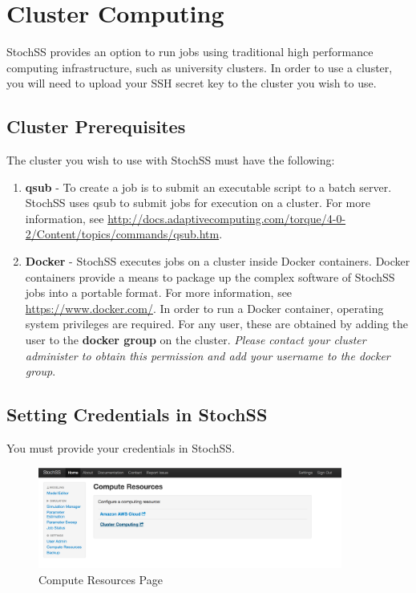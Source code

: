\chapter{Cluster Computing}

StochSS provides an option to run jobs using traditional high performance computing infrastructure, such as university clusters. In order to use a cluster, you will need to upload your SSH secret key to the cluster you wish to use.


\section{Cluster Prerequisites}
The cluster you wish to use with StochSS must have the following:
\begin{enumerate}
\item \textbf{qsub} - To create a job is to submit an executable script to a batch server. StochSS uses qsub to submit jobs for execution on a cluster. For more information, see \url{http://docs.adaptivecomputing.com/torque/4-0-2/Content/topics/commands/qsub.htm}.
\item \textbf{Docker} - StochSS executes jobs on a cluster inside Docker containers. Docker containers provide a means to package up the complex software of StochSS jobs into a portable format. For more information, see \url{https://www.docker.com/}. In order to run a Docker container, operating system privileges are required. For any user, these are obtained by adding the user to the \textbf{docker group} on the cluster. 
\textit{Please contact your cluster administer to obtain this permission and add your username to the docker group}.
\end{enumerate}

\section{Setting Credentials in StochSS} \label{credentials}
You must provide your credentials in StochSS. 

\begin{figure}[!ht]
\centering
\includegraphics[width=100mm,scale=0.5]{cluster/figure1.png}
\caption{Compute Resources Page}
\label{fig:1}
\end{figure}

